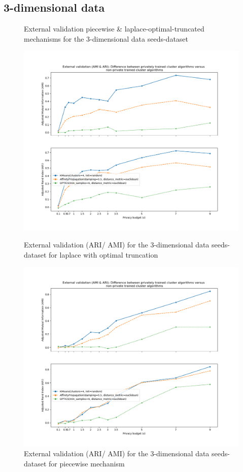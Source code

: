 \subsection{3-dimensional data}
\begin{figure}[H]
    \caption{External validation piecewise \& laplace-optimal-truncated mechanisms for the 3-dimensional data seeds-dataset}
    \centering
    \begin{minipage}[c]{0.49\textwidth}
        \includegraphics[width=1\textwidth]{Results/3d-laplace-optimal-truncated/seeds-dataset/ami-and-ari.png}
        \caption{External validation (ARI/ AMI) for the 3-dimensional data seeds-dataset for laplace with optimal truncation}
        \label{fig:external-validation-seeds-dataset_comparison_3d-laplace}
    \end{minipage}
    \begin{minipage}[c]{0.49\textwidth}
        \includegraphics[width=1\textwidth]{Results/3d-piecewise/seeds-dataset/ami-and-ari.png}
        \caption{External validation (ARI/ AMI) for the 3-dimensional data seeds-dataset for piecewise mechanism}
        \label{fig:external-validation-seeds-dataset_comparison_3d-piecewise}
    \end{minipage}


\end{figure}

